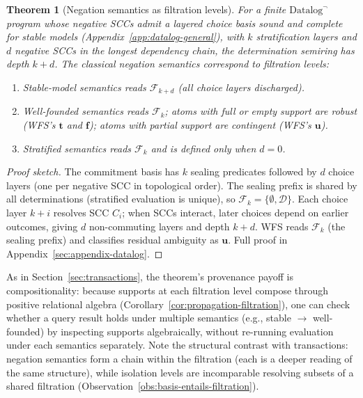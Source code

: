 \documentclass[acmsmall,review,anonymous]{acmart}
\newtheorem{theorem}{Theorem}
\theoremstyle{remark}
\numberwithin{definition}{section}
\numberwithin{theorem}{section}
\numberwithin{lemma}{section}
\numberwithin{corollary}{section}
\numberwithin{remark}{section}
\numberwithin{example}{section}
\numberwithin{observation}{section}
\numberwithin{assumption}{section}
\begin{document}
\begin{theorem}[Negation semantics as filtration levels]
  \label{thm:negation-filtration}
  For a finite $\mbox{Datalog}^\neg$ program whose negative SCCs admit
  a layered choice basis sound and complete for stable models
  (Appendix~\ref{app:datalog-general}), with $k$ stratification
  layers and $d$ negative SCCs in the longest dependency chain, the
  determination semiring has depth $k{+}d$.
  The classical negation semantics correspond to filtration levels:
  \begin{enumerate}[nosep,label=(\alph*)]
    \item Stable-model semantics reads $\mathcal{F}_{k+d}$ (all choice
          layers discharged).
    \item Well-founded semantics reads $\mathcal{F}_k$; atoms with
          full or empty support are \emph{robust} (WFS's $\mathbf{t}$
          and $\mathbf{f}$); atoms with partial support are
          \emph{contingent} (WFS's $\mathbf{u}$).
    \item Stratified semantics reads $\mathcal{F}_k$ and is defined
          only when $d = 0$.
  \end{enumerate}
\end{theorem}
\begin{proof}[Proof sketch]
  The commitment basis has $k$ sealing predicates followed by $d$
  choice layers (one per negative SCC in topological order).
  The sealing prefix is shared by all determinations (stratified
  evaluation is unique), so $\mathcal{F}_k = \{\emptyset, \mathcal{D}\}$.
  Each choice layer $k{+}i$ resolves SCC $C_i$; when SCCs interact,
  later choices depend on earlier outcomes, giving $d$ non-commuting
  layers and depth $k{+}d$.
  WFS reads $\mathcal{F}_k$ (the sealing prefix) and classifies
  residual ambiguity as $\mathbf{u}$.
  Full proof in Appendix~\ref{sec:appendix-datalog}.
\end{proof}

\noindent
As in Section~\ref{sec:transactions}, the theorem's provenance payoff
is compositionality: because supports at each filtration level compose
through positive relational algebra
(Corollary~\ref{cor:propagation-filtration}), one can check whether a
query result holds under multiple semantics (e.g., stable $\to$
well-founded) by inspecting supports algebraically, without re-running
evaluation under each semantics separately.
Note the structural contrast with transactions: negation semantics
form a chain within the filtration (each is a deeper reading of the
same structure), while isolation levels are incomparable resolving
subsets of a shared filtration
(Observation~\ref{obs:basis-entails-filtration}).
\end{document}
